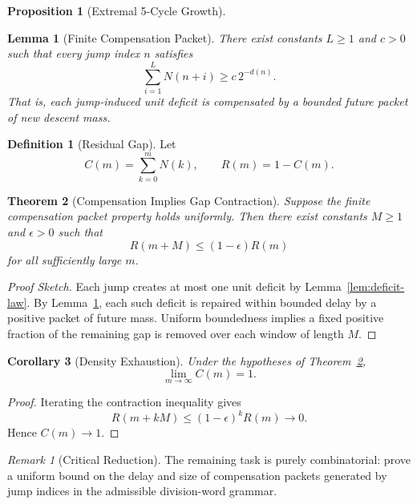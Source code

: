 \documentclass[12pt, oneside]{article}
\numberwithin{equation}{section}
\theoremstyle{definition}
\newtheorem{definition}{Definition}[section]
\newtheorem{proposition}{Proposition}[section]
\theoremstyle{plain}
\newtheorem{theorem}{Theorem}[section]
\newtheorem{lemma}[theorem]{Lemma}
\newtheorem{corollary}[theorem]{Corollary}
\theoremstyle{remark}
\newtheorem*{remark}{Remark}
\begin{document}
\begin{proposition}[Extremal 5-Cycle Growth]

\begin{lemma}[Finite Compensation Packet]
\label{lem:packet}
There exist constants $L\ge1$ and $c>0$ such that every jump index $n$
satisfies
\[
\sum_{i=1}^{L} N(n+i)\ge c\,2^{-d(n)}.
\]
That is, each jump-induced unit deficit is compensated by a bounded
future packet of new descent mass.
\end{lemma}


\begin{definition}[Residual Gap]
Let
\[
C(m)=\sum_{k=0}^{m}N(k),
\qquad
R(m)=1-C(m).
\]
\end{definition}


\begin{theorem}[Compensation Implies Gap Contraction]
\label{thm:gap-contraction}
Suppose the finite compensation packet property holds uniformly.
Then there exist constants $M\ge1$ and $\epsilon>0$ such that
\[
R(m+M)\le (1-\epsilon)R(m)
\]
for all sufficiently large $m$.
\end{theorem}

\begin{proof}[Proof Sketch]
Each jump creates at most one unit deficit by
Lemma~\ref{lem:deficit-law}. By Lemma~\ref{lem:packet}, each such deficit
is repaired within bounded delay by a positive packet of future mass.
Uniform boundedness implies a fixed positive fraction of the remaining
gap is removed over each window of length $M$.
\end{proof}


\begin{corollary}[Density Exhaustion]
\label{cor:density-exhaustion}
Under the hypotheses of Theorem~\ref{thm:gap-contraction},
\[
\lim_{m\to\infty} C(m)=1.
\]
\end{corollary}

\begin{proof}
Iterating the contraction inequality gives
\[
R(m+kM)\le (1-\epsilon)^kR(m)\to0.
\]
Hence $C(m)\to1$.
\end{proof}


\begin{remark}[Critical Reduction]
The remaining task is purely combinatorial: prove a uniform bound on the
delay and size of compensation packets generated by jump indices in the
admissible division-word grammar.
\end{remark}



\end{proposition}
\end{document}
